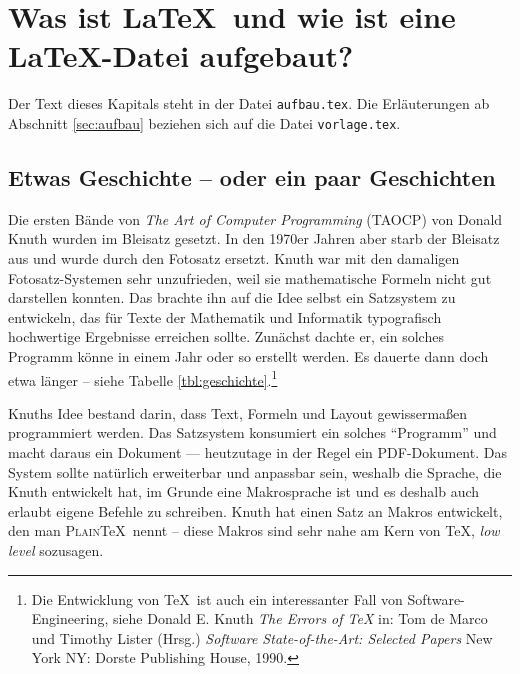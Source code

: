 %

\chapter{Was ist \LaTeX\ und wie ist eine \LaTeX-Datei aufgebaut?}

Der Text dieses Kapitals steht in der Datei \verb=aufbau.tex=. Die
Erläuterungen ab Abschnitt \ref{sec:aufbau} beziehen sich auf die Datei
\verb=vorlage.tex=.

\section{Etwas Geschichte -- oder ein paar Geschichten}

Die ersten Bände von \emph{The Art of Computer Programming}
(\textsc{TAOCP}) von Donald Knuth wurden im Bleisatz gesetzt. In den
1970er Jahren aber starb der Bleisatz aus und wurde durch den Fotosatz
ersetzt. Knuth war mit den damaligen Fotosatz-Systemen sehr unzufrieden,
weil sie mathematische Formeln nicht gut darstellen konnten. Das brachte
ihn auf die Idee selbst ein Satzsystem zu entwickeln, das für
Texte der Mathematik und Informatik typografisch hochwertige Ergebnisse
erreichen sollte. Zunächst dachte er, ein solches Programm könne in
einem Jahr oder so erstellt werden. Es dauerte dann doch etwa
länger -- siehe Tabelle \ref{tbl:geschichte}.\footnote{ Die Entwicklung
von \TeX\ ist auch ein interessanter Fall von Software-Engineering,
siehe Donald E. Knuth \emph{The Errors of \TeX} in: Tom de Marco und
Timothy Lister (Hrsg.) \emph{Software State-of-the-Art: Selected
Papers} New York NY: Dorste Publishing House, 1990.}

Knuths Idee \cite{knuth99} bestand darin, dass Text, Formeln und Layout
gewissermaßen programmiert werden. Das Satzsystem konsumiert ein solches
\enquote{Programm} und macht daraus ein Dokument --- heutzutage in der
Regel ein PDF-Dokument. Das System sollte natürlich erweiterbar und
anpassbar sein, weshalb die Sprache, die Knuth entwickelt hat, im Grunde
eine Makrosprache ist und es deshalb auch erlaubt eigene Befehle zu
schreiben. Knuth hat einen Satz an Makros entwickelt, den man
\textsc{Plain}\kern2pt\TeX\ nennt -- diese Makros sind sehr nahe am Kern
von \TeX, \emph{low level} sozusagen.

